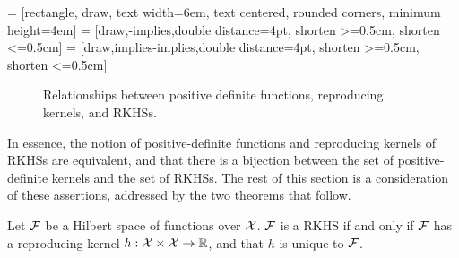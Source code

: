  = [rectangle, draw, text width=6em, text centered, rounded corners, minimum height=4em]
 = [draw,-implies,double distance=4pt, shorten >=0.5cm, shorten <=0.5cm]
 = [draw,implies-implies,double distance=4pt, shorten >=0.5cm, shorten <=0.5cm]

\vspace{0.5em}
\begin{figure}[H]
  \centering
  \caption[Relationship between p.d. functions, rep. kernels, and RKHSs]{Relationships between positive definite functions, reproducing kernels, and RKHSs.}
\end{figure}
\vspace{-0.5em}

In essence, the notion of positive-definite functions and reproducing kernels of RKHSs are equivalent, and that there is a bijection between the set of positive-definite kernels and the set of RKHSs.
The rest of this section is a consideration of these assertions, addressed by the two theorems that follow.

\begin{theorem}\label{thm:rkhsunique}
  Let ${\mathcal F}$ be a Hilbert space of functions over ${\mathcal X}$.
  ${\mathcal F}$ is a RKHS if and only if ${\mathcal F}$ has a reproducing kernel $h:{\mathcal X}\times{\mathcal X}\to\mathbb{R}$, and that $h$ is unique to ${\mathcal F}$.
\end{theorem}

